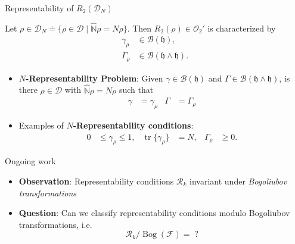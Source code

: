 \documentclass{beamer}
\DeclareMathOperator{\tr}{tr}
\newcommand{\IN}{\ensuremath{\mathbb{N}}}
\newcommand{\HilbertSpace}{\ensuremath{\mathfrak{h}}}
\newcommand{\FockSpace}{\mathcal{F}}
\newcommand{\DensityMatrices}{\mathcal{D}}
\newcommand{\kbOp}[1][k]{{\ensuremath{\mathcal{O}_{#1}}}}
\begin{document}
\begin{frame}{Representability of $R_2(\DensityMatrices_N)$}
    \begin{exampleblock}{}
        Let $\rho\in\DensityMatrices_N\doteq\{\rho\in\DensityMatrices\mid\hat{\IN}\rho=N\rho\}$. Then $R_2(\rho)\in\kbOp[2]'$
        is characterized by
        \begin{align}
            \gamma_\rho&\in\mathcal{B}(\HilbertSpace),\tag{1-RDM}\\
            \Gamma_\rho&\in\mathcal{B}(\HilbertSpace\wedge\HilbertSpace).\tag{2-RDM}
        \end{align}
    \end{exampleblock}
    \begin{itemize}
        \item \textbf{$N$-Representability Problem}: Given $\gamma\in\mathcal{B}(\HilbertSpace)$
        and $\Gamma\in\mathcal{B}(\HilbertSpace\wedge\HilbertSpace)$,  is there $\rho\in\DensityMatrices$ with $\hat{\IN}\rho=N\rho$ such that
            \begin{align}
                \gamma&=\gamma_\rho&\Gamma&=\Gamma_\rho
            \end{align}
        \item Examples of \textbf{$N$-Representability conditions}:
        \begin{equation}
            \begin{aligned}
                0&\le\gamma_\rho\le 1,&
                \tr\{\gamma_\rho\}&=N,&
                \Gamma_\rho&\ge 0.
            \end{aligned}
        \end{equation}
    \end{itemize}
\end{frame}

\begin{frame}{Ongoing work}
  \begin{itemize}
    \item \textbf{Observation}: Representability conditions $\mathcal{R}_k$ invariant under \emph{Bogoliubov transformations}
    \item \textbf{Question}: Can we classify representability conditions modulo Bogoliubov transformations, i.e.
      \begin{equation*}
        \mathcal{R}_k/\operatorname{Bog}(\FockSpace)=\;?
      \end{equation*}
  \end{itemize}
\end{frame}
\end{document}
